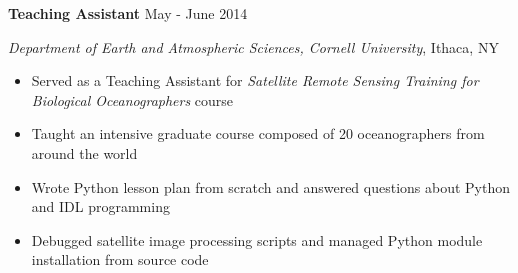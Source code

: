 
\textbf{Teaching Assistant} \hfill May - June 2014

\textit{Department of Earth and Atmospheric Sciences, Cornell University}, Ithaca, NY

\begin{itemize}
    \item Served as a Teaching Assistant for \textit{Satellite Remote Sensing Training for Biological Oceanographers} course
    \item Taught an intensive graduate course composed of 20 oceanographers from around the world
    \item Wrote Python lesson plan from scratch and answered questions about Python and IDL programming
    \item Debugged satellite image processing scripts and managed Python module installation from source code
\end{itemize}
